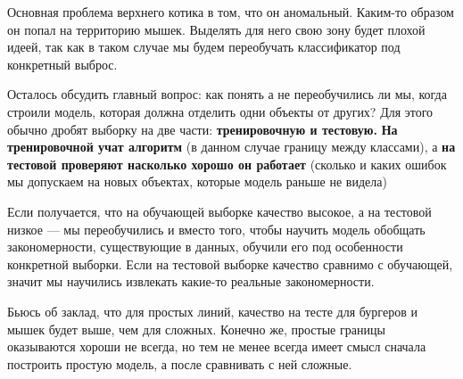 \documentclass[12pt, a4paper, oneside]{article}
\theoremstyle{plain} %
\theoremstyle{definition}
\newcommand{\indef}[1]{\textbf{ \color{green} #1}}
\begin{document}
\begin{solution}
Основная проблема верхнего котика в том, что он аномальный. Каким-то образом он попал на территорию мышек.  Выделять для него свою зону будет плохой идеей, так как в таком случае мы будем переобучать классификатор под конкретный выброс.

Осталось обсудить главный вопрос: как понять а не переобучились ли мы, когда строили модель, которая должна отделить одни объекты от других? Для этого обычно дробят выборку на две части: \indef{тренировочную и тестовую.} \indef{На тренировочной учат алгоритм} (в данном случае границу между классами), а \indef{на тестовой проверяют насколько хорошо он работает} (сколько и каких ошибок мы допускаем на новых объектах, которые модель раньше не видела)

Если получается, что на обучающей выборке качество высокое, а на тестовой низкое --- мы переобучились и вместо того, чтобы научить модель обобщать закономерности, существующие в данных, обучили его под особенности конкретной выборки.  Если на тестовой выборке качество сравнимо с обучающей, значит мы научились извлекать какие-то реальные закономерности.

Бьюсь об заклад, что для простых линий, качество на тесте для бургеров и мышек будет выше, чем для сложных.  Конечно же, простые границы оказываются хороши не всегда, но тем не менее всегда имеет смысл сначала построить простую модель, а после сравнивать с ней сложные. 
\end{solution}
\end{document}
